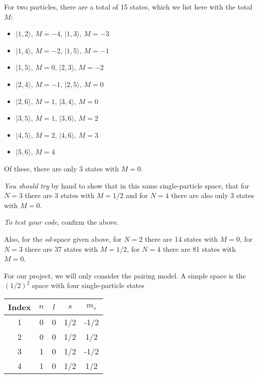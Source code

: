 \documentclass[graybox,sectrefs,envcountresetchap,open=right]{svmonodo}
\begin{document}
\noindent
For two particles, there are a total of 15 states, which we list here with the total $M$:
\begin{itemize}
\item $| 1,2 \rangle$, $M= -4$,  $| 1,3 \rangle$, $M= -3$

\item $| 1,4 \rangle$, $M= -2$, $| 1,5 \rangle$, $M= -1$

\item $| 1,5 \rangle$, $M= 0$, $| 2,3 \rangle$, $M= -2$

\item $| 2,4 \rangle$, $M= -1$, $| 2,5 \rangle$, $M= 0$

\item $| 2,6 \rangle$, $M= 1$, $| 3,4 \rangle$, $M= 0$

\item $| 3,5 \rangle$, $M= 1$, $| 3,6 \rangle$, $M= 2$

\item $| 4,5 \rangle$, $M= 2$, $ | 4,6 \rangle$, $M= 3$

\item $| 5,6 \rangle$, $M= 4$
\end{itemize}

\noindent
Of these, there are only 3 states with $M=0$. 

\emph{You should try} by hand to show that in this same single-particle space, that for 
$N=3$ there are 3 states with $M=1/2$ and for $N= 4$ there are also only 3 states with $M=0$. 

\emph{To test your code}, confirm the above. 

Also, 
for the $sd$-space given above, for $N=2$ there are 14 states with $M=0$, for $N=3$ there are 37 
states with $M=1/2$, for $N=4$ there are 81 states with $M=0$.


For our project, we will only consider the pairing model.
A simple space is the $(1/2)^2$ space with four single-particle states



{\small   %

\vspace{4mm}

\begin{tabular}{ccccc}
\hline
\multicolumn{1}{c}{ Index } & \multicolumn{1}{c}{ $n$ } & \multicolumn{1}{c}{ $l$ } & \multicolumn{1}{c}{ $s$ } & \multicolumn{1}{c}{ $m_s$ } \\
\hline
1     & 0   & 0   & 1/2 & -1/2  \\
2     & 0   & 0   & 1/2 & 1/2   \\
3     & 1   & 0   & 1/2 & -1/2  \\
4     & 1   & 0   & 1/2 & 1/2   \\
\hline
\end{tabular}

\vspace{4mm}

}
\end{document}
